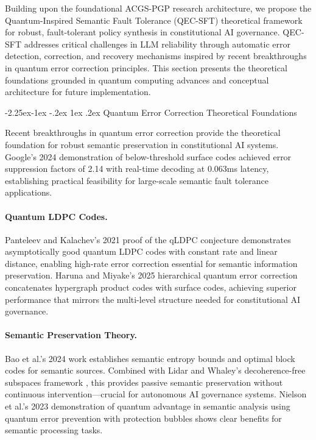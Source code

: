 \documentclass[manuscript,screen,9pt]{acmart}
\makeatletter
\renewcommand\subsection{\@startsection{subsection}{2}{\z@}%
  {-2.25ex\@plus -1ex \@minus -.2ex}%
  {1ex \@plus .2ex}%
  {\normalfont\large\bfseries}}
\makeatother
\begin{document}
Building upon the foundational ACGS-PGP research architecture, we propose the Quantum-Inspired Semantic Fault Tolerance (QEC-SFT) theoretical framework for robust, fault-tolerant policy synthesis in constitutional AI governance. QEC-SFT addresses critical challenges in LLM reliability through automatic error detection, correction, and recovery mechanisms inspired by recent breakthroughs in quantum error correction principles. This section presents the theoretical foundations grounded in quantum computing advances and conceptual architecture for future implementation.

\subsection{Quantum Error Correction Theoretical Foundations}
\label{subsec:qec_foundations}

Recent breakthroughs in quantum error correction provide the theoretical foundation for robust semantic preservation in constitutional AI systems. Google's 2024 demonstration of below-threshold surface codes \cite{Acharya2024QuantumErrorCorrection} achieved error suppression factors of 2.14 with real-time decoding at 0.063ms latency, establishing practical feasibility for large-scale semantic fault tolerance applications.

\paragraph{Quantum LDPC Codes.} Panteleev and Kalachev's 2021 proof of the qLDPC conjecture \cite{Panteleev2021QuantumLDPC} demonstrates asymptotically good quantum LDPC codes with constant rate and linear distance, enabling high-rate error correction essential for semantic information preservation. Haruna and Miyake's 2025 hierarchical quantum error correction \cite{Haruna2025HierarchicalQEC} concatenates hypergraph product codes with surface codes, achieving superior performance that mirrors the multi-level structure needed for constitutional AI governance.

\paragraph{Semantic Preservation Theory.} Bao et al.'s 2024 work \cite{Bao2024SemanticEntropy} establishes semantic entropy bounds and optimal block codes for semantic sources. Combined with Lidar and Whaley's decoherence-free subspaces framework \cite{Lidar2024DecoherenceFree}, this provides passive semantic preservation without continuous intervention—crucial for autonomous AI governance systems. Nielson et al.'s 2023 demonstration \cite{Nielson2023QuantumAdvantage} of quantum advantage in semantic analysis using quantum error prevention with protection bubbles shows clear benefits for semantic processing tasks.
\end{document}
